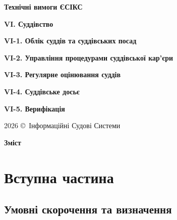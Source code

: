 \documentclass{article}
\newcommand\HUGE[1]{\fontsize{40}{40}\selectfont #1}
\begin{document}
\pagestyle{fancy}

\begin{titlepage}
  \AddToShipoutPictureBG*{\AtPageLowerLeft{\color{nato}\rule{\paperwidth}{\paperheight}}}
  \color{white}\thispagestyle{empty}\vspace*{4cm}\centering
  {\Huge  \textbf{Технічні вимоги ЄСІКС} \par} \vspace{2cm}
  {\HUGE  \textbf{VI. Суддівство} \par} \vspace{2.5cm}
  {\LARGE \textbf{VI-1. Облік суддів та суддівських посад} \par}
  {\LARGE \textbf{VI-2. Управління процедурами суддівської кар'єри} \par}
  {\LARGE \textbf{VI-3. Регулярне оцінювання суддів} \par}
  {\LARGE \textbf{VI-4. Суддівське досьє} \par}
  {\LARGE \textbf{VI-5. Верифікація} \par} \vspace{2.5cm}
  \vfill
  {\large 2026 \copyright\ Інформаційні Судові Системи \par}
\end{titlepage}

\newpage

\begin{center}
  {\Huge\color{nato}\bfseries Зміст\par}
\end{center}
\vspace{40pt}
\tableofcontents

\begin{abstract}
ТЕХНІЧНІ ВИМОГИ
НА СТВОРЕННЯ ЗАСОБУ ІНФОРМАТИЗАЦІЇ - КОМПОНЕНТІВ “СУДДІВСТВО”, ЖИТТЄВОГО ЦИКЛУ ПОСАДИ СУДДІ
ЄДИНОЇ СУДОВОЇ ІНФОРМАЦІЙНО-КОМУНІКАЦІЙНОЇ СИСТЕМИ.
\end{abstract}

\newpage
\section*{Вступна частина}

\subsection*{Умовні скорочення та визначення}
\end{document}
